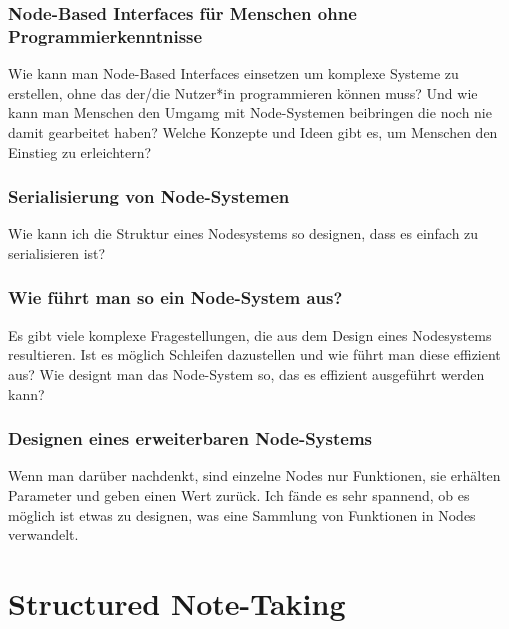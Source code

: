 \documentclass{article}
\begin{document}
\subsubsection{Node-Based Interfaces für Menschen ohne Programmierkenntnisse}
Wie kann man Node-Based Interfaces einsetzen um komplexe Systeme zu erstellen, ohne das der/die Nutzer*in programmieren können muss?
\linebreak
\linebreak
Und wie kann man Menschen den Umgamg mit Node-Systemen beibringen die noch nie damit gearbeitet haben? Welche Konzepte und Ideen gibt es, um Menschen den Einstieg zu erleichtern?

\subsubsection{Serialisierung von Node-Systemen}
Wie kann ich die Struktur eines Nodesystems so designen, dass es einfach zu serialisieren ist?

\subsubsection{Wie führt man so ein Node-System aus?}
Es gibt viele komplexe Fragestellungen, die aus dem Design eines Nodesystems resultieren. Ist es möglich Schleifen dazustellen und wie führt man diese effizient aus?
\linebreak
\linebreak
Wie designt man das Node-System so, das es effizient ausgeführt werden kann?

\subsubsection{Designen eines erweiterbaren Node-Systems}
Wenn man darüber nachdenkt, sind einzelne Nodes nur Funktionen, sie erhälten Parameter und geben einen Wert zurück. 
\linebreak
Ich fände es sehr spannend, ob es möglich ist etwas zu designen, was eine Sammlung von Funktionen in Nodes verwandelt. 
\pagebreak

\section{Structured Note-Taking}
\end{document}
